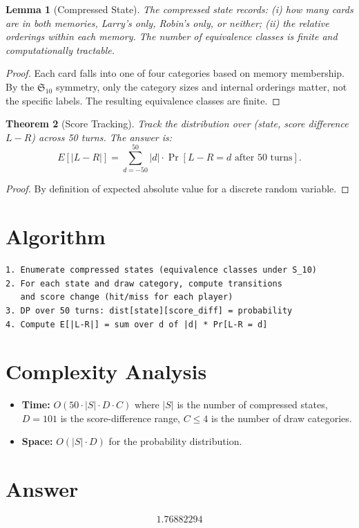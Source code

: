 \documentclass[12pt]{article}
\newtheorem{theorem}{Theorem}
\newtheorem{lemma}[theorem]{Lemma}
\begin{document}
\begin{lemma}[Compressed State]
The compressed state records: (i) how many cards are in both memories, Larry's only, Robin's only, or neither; (ii) the relative orderings within each memory. The number of equivalence classes is finite and computationally tractable.
\end{lemma}

\begin{proof}
Each card falls into one of four categories based on memory membership. By the $\mathfrak{S}_{10}$ symmetry, only the category sizes and internal orderings matter, not the specific labels. The resulting equivalence classes are finite.
\end{proof}

\begin{theorem}[Score Tracking]
Track the distribution over (state, score difference $L-R$) across 50 turns. The answer is:
\[
E[|L - R|] = \sum_{d=-50}^{50} |d| \cdot \Pr[L - R = d \text{ after 50 turns}].
\]
\end{theorem}

\begin{proof}
By definition of expected absolute value for a discrete random variable.
\end{proof}

\section{Algorithm}

\begin{verbatim}
1. Enumerate compressed states (equivalence classes under S_10)
2. For each state and draw category, compute transitions
   and score change (hit/miss for each player)
3. DP over 50 turns: dist[state][score_diff] = probability
4. Compute E[|L-R|] = sum over d of |d| * Pr[L-R = d]
\end{verbatim}

\section{Complexity Analysis}
\begin{itemize}
\item \textbf{Time:} $O(50 \cdot |S| \cdot D \cdot C)$ where $|S|$ is the number of compressed states, $D = 101$ is the score-difference range, $C \leq 4$ is the number of draw categories.
\item \textbf{Space:} $O(|S| \cdot D)$ for the probability distribution.
\end{itemize}

\section{Answer}

\[
\boxed{1.76882294}
\]
\end{document}
